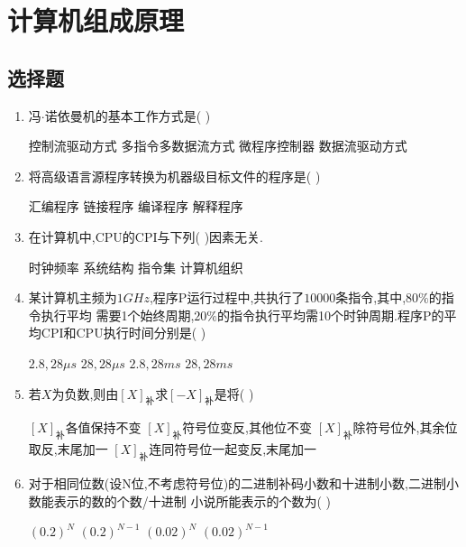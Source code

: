 \documentclass[12pt, a4paper, oneside, UTF8]{ctexbook}
\begin{document}
% 
\else
\fi
\chapter{计算机组成原理}

\section{选择题}
\begin{enumerate}
    \item 冯$\cdot$诺依曼机的基本工作方式是(  ) 
    \begin{choices}[2]
    \task 控制流驱动方式 \task 多指令多数据流方式
    \task 微程序控制器 \task 数据流驱动方式
    \end{choices}
    
    \item \bt 将高级语言源程序转换为机器级目标文件的程序是(   ) 
    \begin{choices}
        \task 汇编程序 
        \task 链接程序 
        \task 编译程序 
        \task 解释程序
    \end{choices}

    \item 在计算机中,CPU的CPI与下列(   )因素无关.
    \begin{choices}
        \task 时钟频率 \task 系统结构 
        \task 指令集 \task 计算机组织 
    \end{choices}


    \item 某计算机主频为$1GHz$,程序P运行过程中,共执行了$10000$条指令,其中,$80\%$的指令执行平均
    需要1个始终周期,$20\%$的指令执行平均需10个时钟周期.程序P的平均CPI和CPU执行时间分别是(   ) 
    \begin{choices}
        \task $2.8,28\mu s$ 
        \task $28,28\mu s$
        \task $2.8,28ms$
        \task $28,28ms$ 
    \end{choices}
    

    \item 若$X$为负数,则由$[X]_{\text{补}}$求$[-X]_{\text{补}}$是将(   )
    \begin{choices}[1]
        \task $[X]_{\text{补}}$各值保持不变
        \task $[X]_{\text{补}}$符号位变反,其他位不变
        \task $[X]_{\text{补}}$除符号位外,其余位取反,末尾加一
        \task $[X]_{\text{补}}$连同符号位一起变反,末尾加一
    \end{choices}


    \item 对于相同位数(设N位,不考虑符号位)的二进制补码小数和十进制小数,二进制小数能表示的数的个数/十进制
    小说所能表示的个数为(  )
    \begin{choices}
        \task $(0.2)^{N}$
        \task $(0.2)^{N-1}$
        \task $(0.02)^{N}$
        \task $(0.02)^{N-1}$ 
    \end{choices}
    


\end{enumerate}
\end{document}
